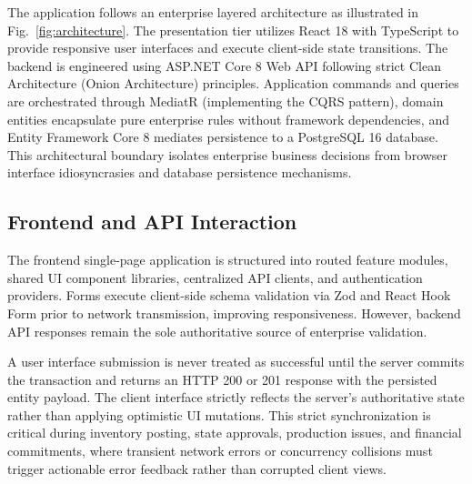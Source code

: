 \documentclass[conference]{IEEEtran}
\begin{document}
The application follows an enterprise layered architecture as illustrated in Fig.~\ref{fig:architecture}. The presentation tier utilizes React 18 with TypeScript to provide responsive user interfaces and execute client-side state transitions. The backend is engineered using ASP.NET Core 8 Web API following strict Clean Architecture (Onion Architecture) principles. Application commands and queries are orchestrated through MediatR (implementing the CQRS pattern), domain entities encapsulate pure enterprise rules without framework dependencies, and Entity Framework Core 8 mediates persistence to a PostgreSQL 16 database. This architectural boundary isolates enterprise business decisions from browser interface idiosyncrasies and database persistence mechanisms.

\subsection{Frontend and API Interaction}
The frontend single-page application is structured into routed feature modules, shared UI component libraries, centralized API clients, and authentication providers. Forms execute client-side schema validation via Zod and React Hook Form prior to network transmission, improving responsiveness. However, backend API responses remain the sole authoritative source of enterprise validation. 

A user interface submission is never treated as successful until the server commits the transaction and returns an HTTP 200 or 201 response with the persisted entity payload. The client interface strictly reflects the server's authoritative state rather than applying optimistic UI mutations. This strict synchronization is critical during inventory posting, state approvals, production issues, and financial commitments, where transient network errors or concurrency collisions must trigger actionable error feedback rather than corrupted client views.
\end{document}
